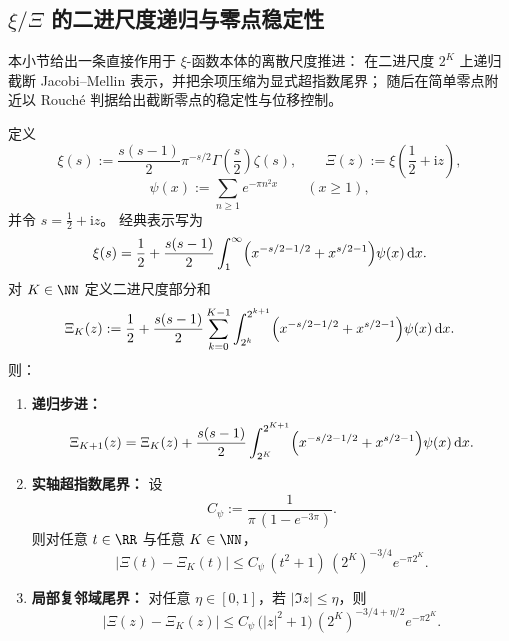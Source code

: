 \subsection{\texorpdfstring{$\xi/\Xi$}{xi/Xi} 的二进尺度递归与零点稳定性}\label{subsec:conclusion-xi-dyadic-recursion-zero-stability}
本小节给出一条直接作用于 \(\xi\)-函数本体的离散尺度推进：
在二进尺度 \(2^K\) 上递归截断 Jacobi--Mellin 表示，并把余项压缩为显式超指数尾界；
随后在简单零点附近以 Rouch\'e 判据给出截断零点的稳定性与位移控制。

\begin{theorem}[二进尺度递归与超指数余项界]\label{thm:conclusion-xi-dyadic-recursion-superexp}
定义
\[
\xi(s):=\frac{s(s-1)}{2}\pi^{-s/2}\Gamma\!\left(\frac{s}{2}\right)\zeta(s),
\qquad
\Xi(z):=\xi\!\left(\frac12+\mathrm{i}z\right),
\]
\[
\psi(x):=\sum_{n\ge 1}e^{-\pi n^2x}\qquad(x\ge 1),
\]
并令 \(s=\frac12+\mathrm{i}z\)。
经典表示写为
\begin{equation}\label{eq:conclusion-xi-integral}
\xi(s)=\frac12+\frac{s(s-1)}{2}\int_{1}^{\infty}
\Bigl(x^{-s/2-1/2}+x^{s/2-1}\Bigr)\psi(x)\,\mathrm{d}x.
\end{equation}
对 \(K\in\NN\) 定义二进尺度部分和
\begin{equation}\label{eq:conclusion-xi-dyadic-partial}
\Xi_K(z):=
\frac12+\frac{s(s-1)}{2}\sum_{k=0}^{K-1}
\int_{2^k}^{2^{k+1}}
\Bigl(x^{-s/2-1/2}+x^{s/2-1}\Bigr)\psi(x)\,\mathrm{d}x.
\end{equation}
则：
\begin{enumerate}
  \item \textbf{递归步进：}
  \begin{equation}\label{eq:conclusion-xi-dyadic-recursion}
  \Xi_{K+1}(z)=\Xi_K(z)+\frac{s(s-1)}{2}
  \int_{2^K}^{2^{K+1}}
  \Bigl(x^{-s/2-1/2}+x^{s/2-1}\Bigr)\psi(x)\,\mathrm{d}x.
  \end{equation}

  \item \textbf{实轴超指数尾界：}
  设
  \[
  C_{\psi}:=\frac{1}{\pi\,(1-e^{-3\pi})}.
  \]
  则对任意 \(t\in\RR\) 与任意 \(K\in\NN\)，
  \begin{equation}\label{eq:conclusion-xi-tail-real}
  \bigl|\Xi(t)-\Xi_K(t)\bigr|
  \le
  C_{\psi}\,(t^2+1)\,(2^K)^{-3/4}e^{-\pi 2^K}.
  \end{equation}

  \item \textbf{局部复邻域尾界：}
  对任意 \(\eta\in[0,1]\)，若 \(|\Im z|\le \eta\)，则
  \begin{equation}\label{eq:conclusion-xi-tail-strip}
\bigl|\Xi(z)-\Xi_K(z)\bigr|
  \le
  C_{\psi}\,\bigl(|z|^2+1\bigr)\,(2^K)^{-3/4+\eta/2}e^{-\pi 2^K}.
  \end{equation}
\end{enumerate}
\end{theorem}
